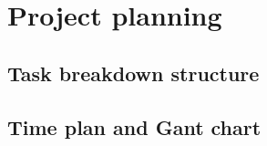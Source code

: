 \chapter{Project planning}
\section{Task breakdown structure}





\section{Time plan and Gant chart}


